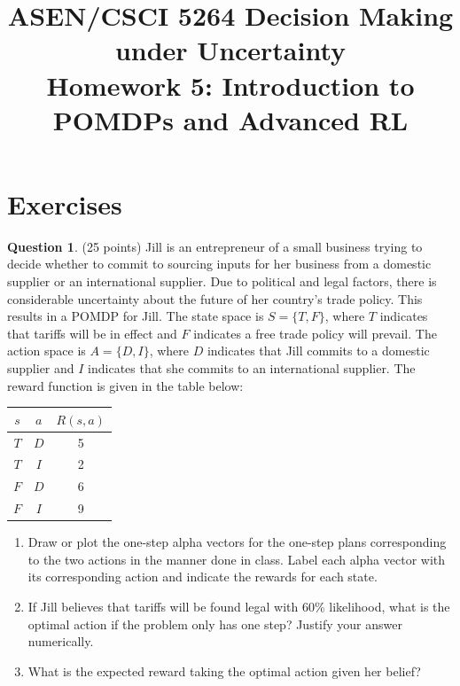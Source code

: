 \documentclass{article}
\title{ASEN/CSCI 5264 Decision Making under Uncertainty\\
       Homework 5: Introduction to POMDPs and Advanced RL}
\theoremstyle{definition}
\newtheorem{question}[thm]{Question}
\begin{document}
\maketitle

\section{Exercises}

\begin{question}(25 points)
    Jill is an entrepreneur of a small business trying to decide whether to commit to sourcing inputs for her business from a domestic supplier or an international supplier. Due to political and legal factors, there is considerable uncertainty about the future of her country's trade policy. This results in a POMDP for Jill. The state space is $S = \{T, F\}$, where $T$ indicates that tariffs will be in effect and $F$ indicates a free trade policy will prevail. The action space is $A = \{D, I\}$, where $D$ indicates that Jill commits to a domestic supplier and $I$ indicates that she commits to an international supplier.
    The reward function is given in the table below:
    \begin{center}
        \begin{tabular}{cc|c}
            \toprule
            $s$ & $a$ & $R(s, a)$ \\
            \midrule
            $T$ & $D$ & 5 \\
            $T$ & $I$ & 2 \\
            $F$ & $D$ & 6 \\
            $F$ & $I$ & 9 \\
            \bottomrule
        \end{tabular}
    \end{center}
\end{question}

\begin{enumerate}[label=\alph*),noitemsep]
    \item Draw or plot the one-step alpha vectors for the one-step plans corresponding to the two actions in the manner done in class. Label each alpha vector with its corresponding action and indicate the rewards for each state.
    \item If Jill believes that tariffs will be found legal with 60\% likelihood, what is the optimal action if the problem only has one step? Justify your answer numerically.
    \item What is the expected reward taking the optimal action given her belief?
\end{enumerate}
\end{document}

